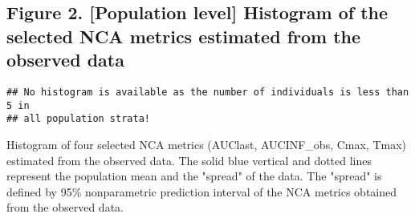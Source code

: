 \documentclass[pdflatex, a4paper, 11pt]{article}\usepackage[]{graphicx}\usepackage[]{color}
\makeatletter
\newenvironment{kframe}{%
 \def\at@end@of@kframe{}%
 \ifinner\ifhmode%
  \def\at@end@of@kframe{\end{minipage}}%
  \begin{minipage}{\columnwidth}%
 \fi\fi%
 \def\FrameCommand##1{\hskip\@totalleftmargin \hskip-\fboxsep
 \colorbox{shadecolor}{##1}\hskip-\fboxsep
     \hskip-\linewidth \hskip-\@totalleftmargin \hskip\columnwidth}%
 \MakeFramed {\advance\hsize-\width
   \@totalleftmargin\z@ \linewidth\hsize
   \@setminipage}}%
 {\par\unskip\endMakeFramed%
 \at@end@of@kframe}
\newenvironment{knitrout}{}{} %
\numberwithin{equation}{section}
\numberwithin{figure}{section}
\numberwithin{table}{section}
\makeatother
\begin{document}
\begin{sloppypar}
\newpage
\subsection{Figure 2. [Population level] Histogram of the selected NCA metrics estimated from the observed data}
\begin{knitrout}
\color{fgcolor}\begin{kframe}
\begin{lstlisting}[basicstyle=\ttfamily,breaklines=true]
## No histogram is available as the number of individuals is less than 5 in
## all population strata!
\end{lstlisting}
\end{kframe}
\end{knitrout}

Histogram of four selected NCA metrics (AUClast, AUCINF\_obs, Cmax, Tmax) estimated from the observed data. The solid blue vertical and dotted lines represent the population mean and the "spread" of the data. The "spread" is defined by 95\% nonparametric prediction interval of the NCA metrics obtained from the observed data.

\end{sloppypar}
\end{document}
